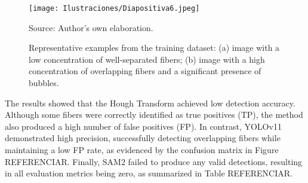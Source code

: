 \begin{figure}[htb]
    \centering
    \texttt{[image: Ilustraciones/Diapositiva6.jpeg]}
    \caption{Representative examples from the training dataset: (a) image with a low concentration of well-separated fibers; (b) image with a high concentration of overlapping fibers and a significant presence of bubbles.}
    Source: Author's own elaboration.
    \label{trainingdataset}
\end{figure}

The results showed that the Hough Transform achieved low detection accuracy. Although some fibers were correctly identified as true positives (TP), the method also produced a high number of false positives (FP). In contrast, YOLOv11 demonstrated high precision, successfully detecting overlapping fibers while maintaining a low FP rate, as evidenced by the confusion matrix in Figure REFERENCIAR. Finally, SAM2 failed to produce any valid detections, resulting in all evaluation metrics being zero, as summarized in Table REFERENCIAR.



